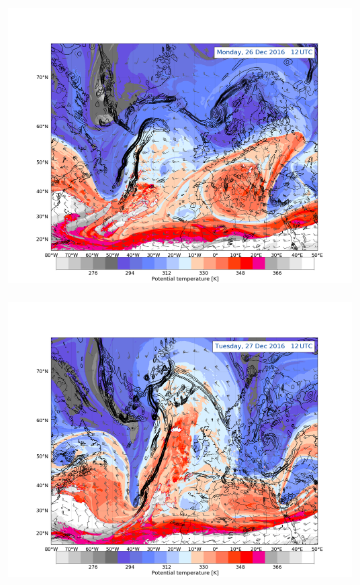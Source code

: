\begin{figure}
\begin{subfigure}[b]{0.49\textwidth}
    \end{subfigure}    
    \begin{subfigure}[b]{0.49\textwidth}
        \includegraphics[trim={4.2cm 3.9cm 4.3cm 5.1cm},clip,
        width=\textwidth]{./fig_DynTropo/20161226_12}
        \caption{}\label{fig:DT26}
    \end{subfigure}
    \begin{subfigure}[b]{0.49\textwidth}
        \includegraphics[trim={4.2cm 3.9cm 4.3cm 5.1cm},clip,
        width=\textwidth]{./fig_DynTropo/20161227_12}
        \caption{}\label{fig:DT27}
    \end{subfigure}   

\end{figure}
